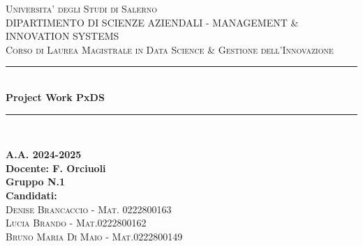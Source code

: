 \documentclass{article}
\newcommand{\HRule}{\rule{\linewidth}{0.5mm}}
\begin{document}
	
	\begin{titlepage}
	\thispagestyle{fancy} %
	\fancyhf{} %
		\begin{center}
			
			\textsc{\LARGE Universita' degli Studi di Salerno}\\[1.5cm]
			\textsc{\large DIPARTIMENTO DI SCIENZE AZIENDALI - MANAGEMENT \& INNOVATION SYSTEMS}\\[0.2cm]
			\textsc{\large Corso di Laurea Magistrale in Data Science \& Gestione dell'Innovazione}\\[0.2cm]
			
			\HRule \\[0.3cm]
			{ \huge \bfseries Project Work PxDS}\\[0.4cm]
			\HRule \\[1.5cm]
			
			\begin{center}
				\textbf{A.A. 2024-2025} \\
				\textbf{Docente: F. Orciuoli} \\[1.5cm]
				\textbf{Gruppo N.1}\\
				\textbf{\bfseries Candidati:\\}
				\textsc{Denise Brancaccio - Mat. 0222800163}\\
				\textsc{Lucia Brando - Mat.0222800162}\\
				\textsc{Bruno Maria Di Maio - Mat.0222800149}
				
			\end{center}
			
		\end{center}
	\end{titlepage}
\newpage
\end{document}
